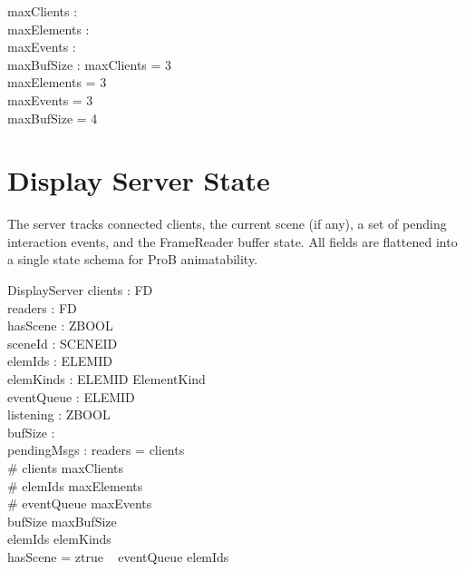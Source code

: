 \documentclass[a4paper,10pt,fleqn]{article}
\begin{document}
\begin{axdef}
  maxClients : \nat \\
  maxElements : \nat \\
  maxEvents : \nat \\
  maxBufSize : \nat
  \where
  maxClients = 3 \\
  maxElements = 3 \\
  maxEvents = 3 \\
  maxBufSize = 4
\end{axdef}

\section{Display Server State}

The server tracks connected clients, the current scene (if any),
a set of pending interaction events, and the FrameReader buffer
state.  All fields are flattened into a single state schema for
ProB animatability.

\begin{schema}{DisplayServer}
  clients : \power FD \\
  readers : \power FD \\
  hasScene : ZBOOL \\
  sceneId : SCENEID \\
  elemIds : \power ELEMID \\
  elemKinds : ELEMID \pfun ElementKind \\
  eventQueue : \power ELEMID \\
  listening : ZBOOL \\
  bufSize : \nat \\
  pendingMsgs : \nat
  \where
  readers = clients \\
  \# clients \leq maxClients \\
  \# elemIds \leq maxElements \\
  \# eventQueue \leq maxEvents \\
  bufSize \leq maxBufSize \\
  elemIds \subseteq \dom elemKinds \\
  hasScene = ztrue \implies
\quad~ eventQueue \subseteq elemIds
\end{schema}
\end{document}
